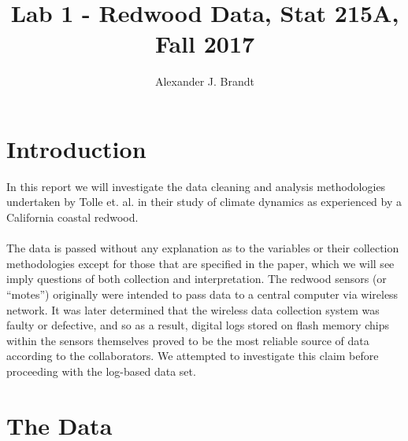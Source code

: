 \documentclass[english]{article}\usepackage[]{graphicx}\usepackage[]{color}
\begin{document}
\title{Lab 1 - Redwood Data, Stat 215A, Fall 2017}

\author{Alexander J. Brandt}

\maketitle





\section{Introduction}

In this report we will investigate the data cleaning and analysis methodologies undertaken by Tolle et. al. in their study of climate dynamics as experienced by a California coastal redwood.\\\\
The data is passed without any explanation as to the variables or their collection
methodologies except for those that are specified in the paper, which we will see
imply questions of both collection and interpretation.  The redwood sensors (or ``motes'')
originally were intended to pass data to a central computer via wireless network.  It was
later determined that the wireless data collection system was faulty or defective, and
so as a result, digital logs stored on flash memory chips within the sensors themselves 
proved to be the most reliable source of data according to the collaborators.  We attempted
to investigate this claim before proceeding with the log-based data set.\\

\section{The Data}
\end{document}
